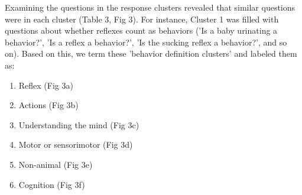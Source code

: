 \documentclass[a4paper, 11pt]{article}
\begin{document}




Examining the questions in the response clusters revealed that similar questions were in each cluster (Table 3, Fig 3). For instance, Cluster 1 was filled with questions about whether reflexes count as behaviors ('Is a baby urinating a behavior?', 'Is a reflex a behavior?', 'Is the sucking reflex a behavior?', and so on). Based on this, we term these 'behavior definition clusters' and labeled them as:

\begin{enumerate}
 \item Reflex (Fig 3a)
 \item Actions (Fig 3b)
 \item Understanding the mind  (Fig 3c)
 \item Motor or sensorimotor  (Fig 3d)
 \item Non-animal  (Fig 3e)
 \item Cognition  (Fig 3f)
\end{enumerate}
\end{document}
